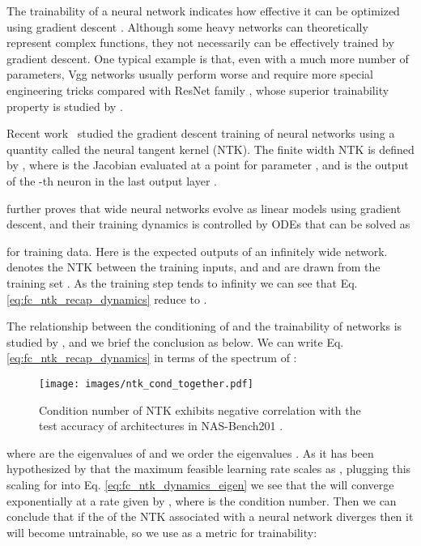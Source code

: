 \documentclass{article} \usepackage{iclr2021_conference,times}
\begin{document}
The trainability of a neural network indicates how effective it can be optimized using gradient descent \citep{burkholz2019initialization,hayou2019impact,shin2020trainability}. Although some heavy networks can theoretically represent complex functions, they not necessarily can be effectively trained by gradient descent. One typical example is that, even with a much more number of parameters, Vgg networks \citep{simonyan2014very} usually perform worse and require more special engineering tricks compared with ResNet family \citep{he2016deep}, whose superior trainability property is studied by \citet{yang2017mean}.

Recent work~\citep{jacot2018neural,lee2019wide,chizat2019lazy} studied the gradient descent training of neural networks using a quantity called the neural tangent kernel (NTK).
The finite width NTK is defined by , where  is the Jacobian evaluated at a point  for parameter , and  is the output of the -th neuron in the last output layer .

\citet{lee2019wide} further proves that wide neural networks evolve as linear models using gradient descent, and their training dynamics is controlled by ODEs that can be solved as

\normalsize
for training data. Here  is the expected outputs of an infinitely wide network.  denotes the NTK between the training inputs, and  and  are drawn from the training set .
As the training step  tends to infinity we can see that Eq. \ref{eq:fc_ntk_recap_dynamics} reduce to .

The relationship between the conditioning of  and the trainability of networks is studied by \citet{xiao2019disentangling}, and we brief the conclusion as below. We can write Eq. \ref{eq:fc_ntk_recap_dynamics} in terms of the spectrum of :


\begin{wrapfigure}{r}{63mm}
\vspace{-1em}
\texttt{[image: images/ntk\_cond\_together.pdf]}
\centering
\vspace{-2em}
\caption{Condition number of NTK  exhibits negative correlation with the test accuracy of architectures in NAS-Bench201 \citep{dong2020bench}.}
\label{fig:ntk_201}
\vspace{-0.5em}
\end{wrapfigure}

where  are the eigenvalues of  and we order the eigenvalues .
As it has been hypothesized by \citet{lee2019wide} that the maximum feasible learning rate scales as , plugging this scaling for  into Eq. \ref{eq:fc_ntk_dynamics_eigen} we see that the  will converge exponentially at a rate given by , where  is the condition number. Then we can conclude that if the  of the NTK associated with a neural network diverges then it will become untrainable, so we use  as a metric for trainability:
\end{document}
